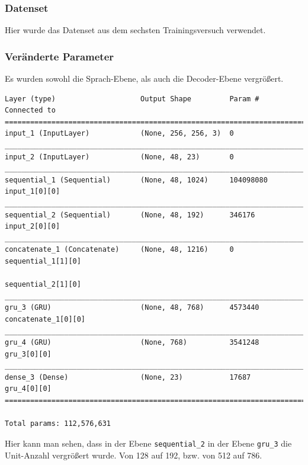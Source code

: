 \documentclass[pdftex,a4paper,halfparskip, article]{scrartcl}
\begin{document}
\subsubsection*{Datenset}

Hier wurde das Datenset aus dem sechsten Trainingsversuch verwendet.


\subsubsection*{Veränderte Parameter}

Es wurden sowohl die Sprach-Ebene, als auch die Decoder-Ebene vergrößert.

\begin{verbatim}
Layer (type)                    Output Shape         Param #     Connected to
=============================================================================
input_1 (InputLayer)            (None, 256, 256, 3)  0
_____________________________________________________________________________
input_2 (InputLayer)            (None, 48, 23)       0
_____________________________________________________________________________
sequential_1 (Sequential)       (None, 48, 1024)     104098080   input_1[0][0]
_____________________________________________________________________________
sequential_2 (Sequential)       (None, 48, 192)      346176      input_2[0][0]
_____________________________________________________________________________
concatenate_1 (Concatenate)     (None, 48, 1216)     0           sequential_1[1][0]
                                                                 sequential_2[1][0]
_____________________________________________________________________________
gru_3 (GRU)                     (None, 48, 768)      4573440     concatenate_1[0][0]
_____________________________________________________________________________
gru_4 (GRU)                     (None, 768)          3541248     gru_3[0][0]
_____________________________________________________________________________
dense_3 (Dense)                 (None, 23)           17687       gru_4[0][0]
=============================================================================

Total params: 112,576,631

\end{verbatim}

Hier kann man sehen, dass in der Ebene \texttt{sequential\_2} in der Ebene \texttt{gru\_3} die Unit-Anzahl vergrößert wurde. Von 128 auf 192, bzw. von 512 auf 786.
\end{document}
